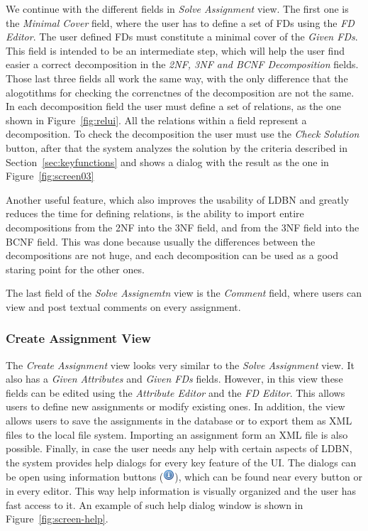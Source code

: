 We continue with the different fields in \textit{Solve Assignment} view. 
The first one is the \textit{Minimal Cover} field, where the user has to define 
a set of FDs using the \textit{FD Editor}. The user defined FDs must
constitute a minimal cover of the \textit{Given FDs}.
This field is intended to be an intermediate step, which will help the user 
find easier a correct decomposition
in the \textit{2NF, 3NF and BCNF Decomposition} fields. Those last three fields all
work the same way, with the only difference that the alogotithms for checking the 
correnctnes of the 
decomposition are not the same.  
In each decomposition field the user must define a set of relations, as the one shown 
in Figure~\ref{fig:relui}. All the relations
within a field represent a decomposition. To check the decomposition the user must
use the \textit{Check Solution} button, 
after that the system analyzes the solution by the criteria described in 
Section~\ref{sec:keyfunctions} and shows a dialog with the result 
as the one in Figure~\ref{fig:screen03} 

Another useful feature, which also improves the usability of LDBN and greatly reduces
the time for defining relations, 
is the ability to 
import entire decompositions from the 2NF into the 3NF field, and from the 
3NF field into the BCNF field. This was done because usually 
the differences between the decompositions are not huge, and each decomposition
can be used as a good staring point for the other ones.	

The last field of the \textit{Solve Assignemtn} view is the \textit{Comment} field, 
where users can view and post textual comments on every assignment.

\subsubsection{Create Assignment View}
The \textit{Create Assignment} view looks very similar to the 
\textit{Solve Assignment} view. It also has a \textit{Given Attributes} and 
\textit{Given FDs} fields. However, in this view these fields
can be edited using the \textit{Attribute Editor} and the \textit{FD Editor}. 
This allows users to define new assignments or modify existing ones. In addition, the view
allows users to save the assignments in the database or to export them as XML
files to the local file system. Importing an assignment form an XML file is also 
possible.  
\newline
Finally, in case the user needs any help with certain aspects of LDBN, the system provides 
help dialogs for every key feature of the UI. The dialogs can be open
using information buttons (\includegraphics[scale=0.5]{./img/info.png}), which can be
found near every button or in every editor. This way help information is 
visually organized and the user has fast access to it. An example of such help dialog
window is shown in Figure~\ref{fig:screen-help}.

